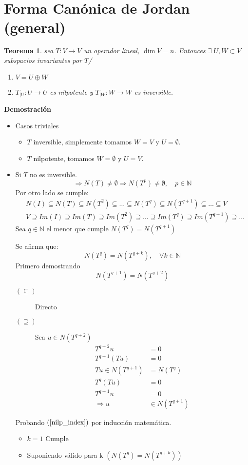 \documentclass[10pt,a4paper]{article}
\newtheorem{mytheo}{Teorema}
\begin{document}
\section{Forma Canónica de Jordan (general)}
\begin{mytheo}
	sea $T:V\rightarrow V$ un operador lineal, $\dim V = n$. Entonces $\exists\;U, W\subset V$ subspacios invariantes por $T$/
	\begin{enumerate}
		\item $V = U\oplus W$
		\item $T_{|U}:U\rightarrow U$ es nilpotente y $T_{|W}:W\rightarrow W$ es inversible.
	\end{enumerate}
\end{mytheo}
\textbf{Demostración}\\
\begin{itemize}
	\item Casos triviales
			\begin{itemize}
				\item $T$ inversible, simplemente tomamos $W = V$ y $U=\emptyset$.
				\item $T$ nilpotente, tomamos $W = \emptyset$ y $U = V$.
			\end{itemize}
	\item Si $T$ no es inversible.
		$$\Rightarrow N(T) \neq \emptyset \Rightarrow N(T^{p}) \neq \emptyset,\quad p\in\mathbb{N}$$
		Por otro lado se cumple:
		\begin{align*}
		& N(I)\subseteq N(T)\subseteq N(T^{2})\subseteq \ldots\subseteq N(T^{q})\subseteq N(T^{q+1}) \subseteq\ldots\subseteq V\\
		& V \supseteq Im(I)\supseteq Im(T)\supseteq Im(T^{2})\supseteq\ldots\supseteq Im(T^{q})\supseteq Im(T^{q+1})\supseteq\ldots
		\end{align*}
		Sea $q\in\mathbb{N}$ el menor que cumple $N(T^{q}) = N(T^{q+1})$
		
		Se afirma que:
		\begin{equation}\label{nilp_index}
		N(T^{q}) =  N(T^{q+k}),\quad\forall k\in\mathbb{N}
		\end{equation}
		Primero demostrando
		$$N(T^{q+1}) = N(T^{q+2})$$
		\begin{description}
			\item[$(\subseteq)$] Directo
			\item[$(\supseteq)$] Sea $u\in N(T^{q+2})$
			\begin{align*}
				T^{q+2}u &= 0\\
				T^{q+1}(Tu) &= 0\\
				Tu\in N(T^{q+1}) &= N(T^{q})\\
				T^{q}(Tu) &= 0\\
				T^{q+1}u &= 0\\
				\Rightarrow u &\in N(T^{q+1})
			\end{align*}
		\end{description}
		Probando $\left(\ref{nilp_index}\right)$ por inducción matemática.
		\begin{itemize}
			\item $k = 1$ Cumple
			\item Suponiendo válido para k $\left(N\left(T^{q}\right) = N\left(T^{q+k}\right) \right)$
			

\end{itemize}
\end{itemize}
\end{document}
